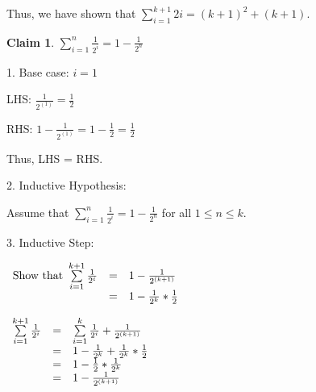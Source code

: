 \documentclass{article}
\newtheorem{claim}{Claim}
\begin{document}
      Thus, we have shown that $\sum\limits_{i=1}^{k+1} 2i = (k+1)^2+(k+1)$.
      

    \begin{claim}
      $\sum\limits_{i=1}^{n} \frac{1}{2^i} = 1 - \frac{1}{2^n}$
    \end{claim}


      \vspace{1mm}
      1. Base case: $i = 1$

      LHS: $\frac{1}{2^(1)} = \frac{1}{2}$

      RHS: $1 - \frac{1}{2^(1)} = 1 - \frac{1}{2} = \frac{1}{2}$

      Thus, LHS = RHS.

      \vspace{5mm}
      2. Inductive Hypothesis: 

      Assume that $\sum\limits_{i=1}^{n} \frac{1}{2^i} = 1 - \frac{1}{2^n}$ for all $1 \leqslant n \leqslant k$.

      \vspace{5mm}
      3. Inductive Step: 

      \begin{math}
        \begin{array}{r c l}
          \textnormal{Show that } \sum\limits_{i=1}^{k+1} \frac{1}{2^i} & = & 1 - \frac{1}{2^{(k+1)}} \\
                                                                        & = & 1 - \frac{1}{2^k} * \frac{1}{2} \\
        \end{array}
      \end{math}

      \begin{math}
        \begin{array}{r c l}
          \sum\limits_{i=1}^{k+1} \frac{1}{2^i} & = & \sum\limits_{i=1}^{k} \frac{1}{2^i} + \frac{1}{2^{(k+1)}} \\
                                                & = & 1 - \frac{1}{2^k} + \frac{1}{2^k} * \frac{1}{2} \\
                                                & = & 1 - \frac{1}{2} * \frac{1}{2^k} \\
                                                & = & 1 - \frac{1}{2^{(k+1)}} \\
        \end{array}
      \end{math}
\end{document}
